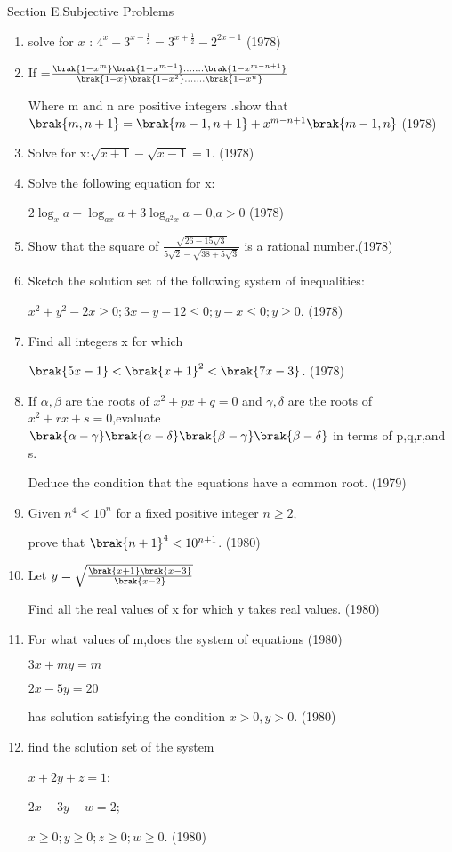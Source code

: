 \documentclass[journal,12pt,twocolumn]{IEEEtran}
\theoremstyle{remark}
\begin{document}
\maketitle\Large{Section E.Subjective Problems}\large
 \begin{enumerate}
     
 \item solve for $x$ : $4^x-3^{x-\frac{1}{2}}=3^{x+\frac{1}{2}}-2^{2x-1}$                       \hfill  (1978)

 

\item If =$\frac{\brak{1-x^m}\brak{1-x^{m-1}}.......\brak{1-x^{m-n+1}}}{\brak{1-x}\brak{1-x^2}.......\brak{1-x^n}}$

Where m and n are positive integers .show that 
$\brak{m,n+1}=\brak{m-1,n+1}+x^{m-n+1}\brak{m-1,n}$ \hfill (1978)
 \item Solve for x:$\sqrt{x+1}-\sqrt{x-1}=1$.   \hfill (1978)
 \item Solve the following equation for x:
 
$2\log_x a+\log_{ax} a+3\log_{a^2x} a=0$,$a>0$ \hfill (1978)
\item Show that the square of $\frac{\sqrt{26-15\sqrt{3}}}{5\sqrt{2}-\sqrt{38+5\sqrt{3}}}$ is a rational number.\hfill (1978) 
\item Sketch the solution set of the following system of inequalities:

$x^2+y^2-2x\geq 0;3x-y-12\leq 0;y-x\leq 0;y\geq 0$. \hfill (1978)
\item Find all integers x for which

$\brak{5x-1}<\brak{{x+1}}^2<\brak{7x-3}$. \hfill (1978)
\item If $\alpha,\beta$ are the roots of $x^2+px+q=0$ and $\gamma,\delta$ are the roots of $x^2+rx+s=0$,evaluate $\brak{\alpha-\gamma}\brak{\alpha-\delta}\brak{\beta-\gamma}\brak{\beta-\delta}$ in terms of p,q,r,and s. 

Deduce the condition that the equations have a common root. \hfill (1979)
\item Given $n^4<10^n$ for a fixed positive integer $n\geq 2$,

prove that $\brak{n+1}^4<10^{n+1}$. \hfill (1980)
\item Let $y=\sqrt{\frac{\brak{x+1}\brak{x-3}}{\brak{x-2}}}$

Find all the real values of x for which y takes real values. \hfill (1980)
\item For what values of m,does the system of equations \hfill (1980)

$3x+my=m$

$2x-5y=20$

has solution satisfying the condition $x>0,y>0$. \hfill (1980)
\item find the solution set of the system

$x+2y+z=1$;

$2x-3y-w=2$;

$x\geq 0;y\geq 0;z\geq 0;w\geq 0$.  \hfill (1980)

 \end{enumerate}
 

 
\end{document}
